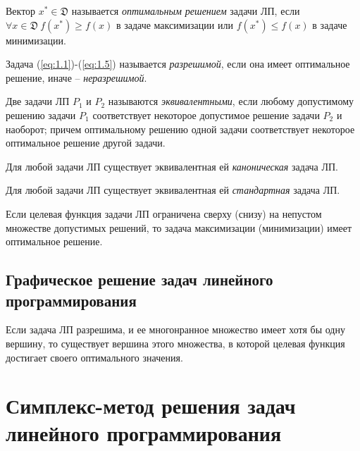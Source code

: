 \begin{definition}
    Вектор $x^{*} \in \mathfrak{D}$ называется \emph{оптимальным решением} задачи ЛП, если $\forall x \in \mathfrak{D} \ f(x^{*}) \geqslant f(x)$ в задаче максимизации или $f(x^{*}) \leqslant f(x)$ в задаче минимизации.
\end{definition}

\begin{definition}
    Задача (\ref{eq:1.1})-(\ref{eq:1.5}) называется \emph{разрешимой}, если она имеет оптимальное решение, иначе -- \emph{неразрешимой}.
\end{definition}

\begin{definition}
    Две задачи ЛП $P_1$ и $P_2$ называются \emph{эквивалентными}, если любому допустимому решению задачи $P_1$ соответствует некоторое допустимое решение задачи $P_2$ и наоборот; причем оптимальному решению одной задачи соответствует некоторое оптимальное решение другой задачи.
\end{definition}

\begin{theorem}
    Для любой задачи ЛП существует эквивалентная ей \emph{каноническая} задача ЛП.
\end{theorem}

\begin{theorem}
    Для любой задачи ЛП существует эквивалентная ей \emph{стандартная} задача ЛП.
\end{theorem}

\begin{theorem}
    Если целевая функция задачи ЛП ограничена сверху (снизу) на непустом множестве допустимых решений, то задача максимизации (минимизации) имеет оптимальное решение.
\end{theorem}

\subsection{Графическое решение задач линейного программирования}

\begin{theorem}
  Если задача ЛП разрешима, и ее многонранное множество имеет хотя бы одну вершину, то существует вершина этого множества, в которой целевая функция достигает своего оптимального значения.
\end{theorem}

\newpage

\section{Симплекс-метод решения задач линейного программирования}

